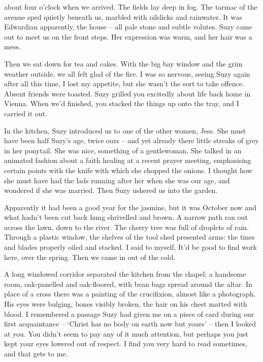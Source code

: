  about four o'clock when we arrived. The fields lay deep in fog. The tarmac of the avenue sped quietly beneath us, marbled with oilslicks and rainwater. It was Edwardian apparently, the house -- all pale stone and subtle volutes. Suzy came out to meet us on the front steps. Her expression was warm, and her hair was a mess.

Then we sat down for tea and cakes. With the big bay window and the grim weather outside, we all felt glad of the fire. I was so nervous, seeing Suzy again after all this time, I lost my appetite, but she wasn't the sort to take offence. Absent friends were toasted. Suzy grilled you excitedly about life back home in Vienna. When we'd finished, you stacked the things up onto the tray, and I carried it out.

In the kitchen, Suzy introduced us to one of the other women, Jess. She must have been half Suzy's age, twice ours -- and yet already there little streaks of grey in her ponytail. She was nice, something of a gentlewoman. She talked in an animated fashion about a faith healing at a recent prayer meeting, emphasising certain points with the knife with which she chopped the onions. I thought how she must have had the lads running after her when she was our age, and wondered if she was married. Then Suzy ushered us into the garden.

Apparently it had been a good year for the jasmine, but it was October now and what hadn't been cut back hung shrivelled and brown. A narrow path ran out across the lawn, down to the river. The cherry tree was full of droplets of rain. Through a plastic window, the shelves of the tool shed presented arms: the tines and blades properly oiled and stacked. I said to myself, It'd be good to find work here, over the spring. Then we came in out of the cold.

A long windowed corridor separated the kitchen from the chapel: a handsome room, oak-panelled and oak-floored, with bean bags spread around the altar. In place of a cross there was a painting of the crucifixion, almost like a photograph. His eyes were bulging, bones visibly broken, the hair on his chest matted with blood. I remembered a passage Suzy had given me on a piece of card during our first acquaintance -- `Christ has no body on earth now but yours' -- then I looked at you. You didn't seem to pay any of it much attention, but perhaps you just kept your eyes lowered out of respect. I find you very hard to read sometimes, and that gets to me.

